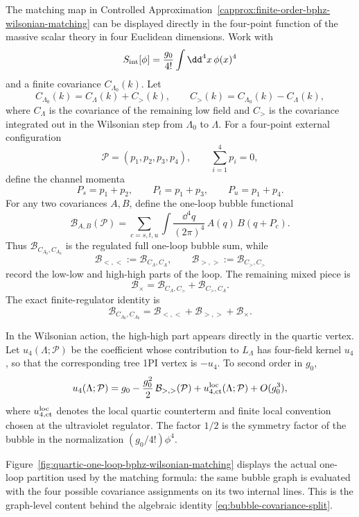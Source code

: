 The matching map in
Controlled Approximation~\ref{capprox:finite-order-bphz-wilsonian-matching}
can be displayed directly in the four-point function of the massive scalar
theory in four Euclidean dimensions.  Work with
\[
  S_{\rm int}[\phi]
  =
  \frac{g_0}{4!}\int\dd^4x\,\phi(x)^4
\]
and a finite covariance \(C_{\Lambda_0}(k)\).  Let
\[
  C_{\Lambda_0}(k)=C_\Lambda(k)+C_{>} (k),
  \qquad
  C_{>}(k)=C_{\Lambda_0}(k)-C_\Lambda(k),
\]
where \(C_\Lambda\) is the covariance of the remaining low field and
\(C_>\) is the covariance integrated out in the Wilsonian step from
\(\Lambda_0\) to \(\Lambda\).  For a four-point external configuration
\[
  \mathcal P=(p_1,p_2,p_3,p_4),
  \qquad
  \sum_{i=1}^4p_i=0,
\]
define the channel momenta
\[
  P_s=p_1+p_2,\qquad
  P_t=p_1+p_3,\qquad
  P_u=p_1+p_4 .
\]
For any two covariances \(A,B\), define the one-loop bubble functional
\[
  \mathcal B_{A,B}(\mathcal P)
  =
  \sum_{c=s,t,u}
  \int\frac{\dd^4q}{(2\pi)^4}\,
  A(q)\,B(q+P_c).
\]
Thus \(\mathcal B_{C_{\Lambda_0},C_{\Lambda_0}}\) is the regulated full
one-loop bubble sum, while
\[
  \mathcal B_{<,<}:=\mathcal B_{C_\Lambda,C_\Lambda},
  \qquad
  \mathcal B_{>,>}:=\mathcal B_{C_>,C_>}
\]
record the low-low and high-high parts of the loop.  The remaining mixed
piece is
\[
  \mathcal B_\times
  =
  \mathcal B_{C_\Lambda,C_>}
  +
  \mathcal B_{C_>,C_\Lambda}.
\]
The exact finite-regulator identity is
\begin{equation}
  \mathcal B_{C_{\Lambda_0},C_{\Lambda_0}}
  =
  \mathcal B_{<,<}
  +
  \mathcal B_{>,>}
  +
  \mathcal B_\times .
  \label{eq:bubble-covariance-split}
\end{equation}

In the Wilsonian action, the high-high part appears directly in the quartic
vertex.  Let \(u_4(\Lambda;\mathcal P)\) be the coefficient whose contribution
to \(L_\Lambda\) has four-field kernel \(u_4\), so that the corresponding
tree 1PI vertex is \(-u_4\).  To second order in \(g_0\),
\begin{equation}
  u_4(\Lambda;\mathcal P)
  =
  g_0
  -
  \frac{g_0^2}{2}\,
  \mathcal B_{>,>}(\mathcal P)
  +
  u^{\rm loc}_{4,{\rm ct}}(\Lambda;\mathcal P)
  +
  O(g_0^3),
  \label{eq:wilsonian-quartic-one-loop-high-bubble}
\end{equation}
where \(u^{\rm loc}_{4,{\rm ct}}\) denotes the local quartic counterterm and
finite local convention chosen at the ultraviolet regulator.  The factor
\(1/2\) is the symmetry factor of the bubble in the normalization
\((g_0/4!)\phi^4\).

Figure~\ref{fig:quartic-one-loop-bphz-wilsonian-matching} displays the actual
one-loop partition used by the matching formula: the same bubble graph is
evaluated with the four possible covariance assignments on its two internal
lines.  This is the graph-level content behind the algebraic identity
\eqref{eq:bubble-covariance-split}.

